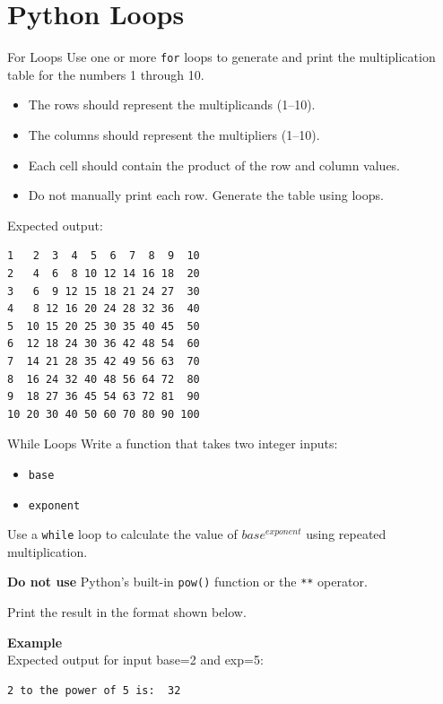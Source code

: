 \documentclass[twoside]{article}
\begin{document}
\maketitle

\section{Python Loops}

\begin{task}{For Loops}{}{}
Use one or more \texttt{for} loops to generate and print the multiplication table for the numbers 1 through 10. 
\begin{itemize} 
    \item The rows should represent the multiplicands (1--10). 
    \item The columns should represent the multipliers (1--10). 
    \item Each cell should contain the product of the row and column values. 
    \item Do not manually print each row. Generate the table using loops. 
\end{itemize} \vspace{10pt}

\vspace{10pt}
Expected output:
\begin{lstlisting}[numbers=none]
1   2  3  4  5  6  7  8  9  10 		
2   4  6  8 10 12 14 16 18  20 		
3   6  9 12 15 18 21 24 27  30 		
4   8 12 16 20 24 28 32 36  40 		
5  10 15 20 25 30 35 40 45  50 		
6  12 18 24 30 36 42 48 54  60 		
7  14 21 28 35 42 49 56 63  70 		
8  16 24 32 40 48 56 64 72  80 		
9  18 27 36 45 54 63 72 81  90 		
10 20 30 40 50 60 70 80 90 100 
\end{lstlisting}

\end{task}

\newpage
\begin{task}{While Loops}{}{}
Write a function that takes two integer inputs: 
\begin{itemize} 
    \item \texttt{base} 
    \item \texttt{exponent} 
\end{itemize} 

Use a \texttt{while} loop to calculate the value of $ base^{exponent}$ using repeated multiplication.

\textbf{Do not use} Python's built-in \texttt{pow()} function or the \texttt{**} operator.

Print the result in the format shown below.

\vspace{10pt}
\textbf{Example}\\
Expected output for input base=2 and exp=5:
\begin{lstlisting}[numbers=none]
2 to the power of 5 is:  32
\end{lstlisting}

\end{task}
\end{document}
